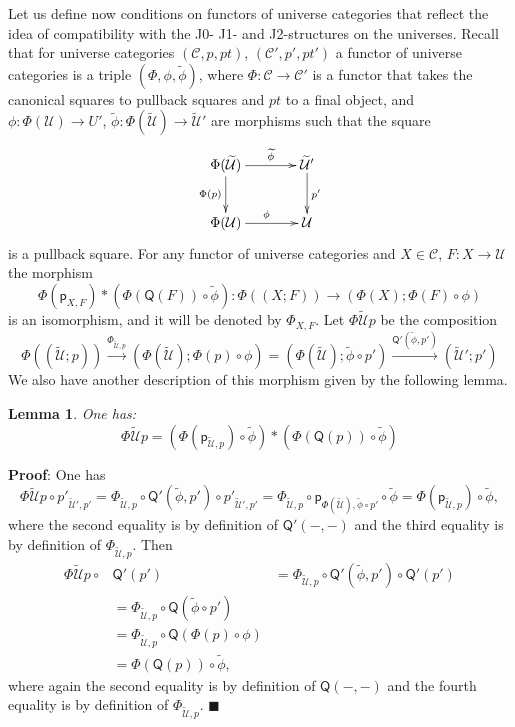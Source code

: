 \documentclass[12pt]{article}
\numberwithin{equation}{section}
\newenvironment{eq}{\begin{equation}}{\end{equation}}
\newenvironment{myproof}{{\bf Proof}:}{$\blacksquare$ \vskip 5mm }
\newtheorem{lemma}[proposition]{Lemma}
\newcommand{\sr}{\rightarrow}
\newcommand{\lr}{\longrightarrow}
\newcommand{\wt}{\widetilde}
\newcommand{\C}{{\mathcal C}}  %
\newcommand{\p}{\mathsf{p}}
\newcommand{\U}{\mathcal{U}}
\newcommand{\Q}{\mathsf{Q}}
\begin{document}
Let us define now conditions on functors of universe categories that reflect
the idea of compatibility with the J0- J1- and J2-structures on the
universes. Recall that for universe categories $({\C},p,pt)$,
$({\C}',p',pt')$ a functor of universe categories is a triple
$(\Phi,\phi,\wt{\phi})$, where $\Phi:{\C}\sr {\C}'$ is a functor
that takes the canonical squares to pullback squares and $pt$ to a final object,
and $\phi:\Phi(\U)\sr U'$, $\wt{\phi}:\Phi(\wt{\U})\sr \wt{\U}'$ are morphisms
such that the square
%
\begin{eq}\label{2015.04.06.eq10}
\begin{xy}
          \xymatrix@C=3pc{ \Phi(\wt{\U}) \ar[r]^-{\wt{\phi}} \ar[d]_{\Phi(p)} &
            \wt{\U}' \ar[d]^{p'}\\ \Phi(\U) \ar[r]^{\phi} & \U }
\end{xy}
\end{eq}%
%
is a pullback square. For any functor of universe categories and $X\in{\mathcal
  C}$, $F:X\sr \U$ the morphism
%
$$\Phi(\p_{X,F})*(\Phi(\Q(F))\circ\wt{\phi}):\Phi((X;F))\sr
(\Phi(X);\Phi(F)\circ\phi)$$
%
is an isomorphism, and it will be denoted by $\Phi_{X,F}$. Let $\Phi\wt{\U}p$ be the
composition
%
$$\Phi((\wt{\U};p)) \stackrel{\Phi_{\wt{\U},p}}{\lr} (\Phi(\wt{\U});\Phi(p)\circ
\phi)=(\Phi(\wt{\U});\wt{\phi}\circ p')\stackrel{\Q'(\wt{\phi},p')}{\lr}
(\wt{\U}';p')$$
%
We also have another description of this morphism given by the following lemma.
%
\begin{lemma}
\label{2015.04.10.l5} One has:
%
$$\Phi\wt{\U}p=(\Phi(\p_{\wt{\U},p})\circ\wt{\phi})*(\Phi(\Q(p))\circ\wt{\phi})$$
%
\end{lemma}
%
\begin{myproof}
One has
%
$$\Phi\wt{\U}p\circ p'_{\wt{\U}',p'}=\Phi_{\wt{\U},p}\circ \Q'(\wt{\phi},p')\circ
p'_{\wt{\U}',p'} =\Phi_{\wt{\U},p}\circ \p_{\Phi(\wt{\U}),\wt{\phi}\circ
  p'}\circ\wt{\phi}=\Phi(\p_{\wt{\U},p})\circ \wt{\phi},$$
%
where the second equality is by definition of $\Q'(-,-)$ and the third equality
is by definition of $\Phi_{\wt{\U},p}$. Then
%
\begin{align*}
  \Phi\wt{\U}p\circ & \Q'(p')
    & = \Phi_{\wt{\U},p}\circ \Q'(\wt{\phi},p')\circ \Q'(p') \\
    & = \Phi_{\wt{\U},p}\circ \Q(\wt{\phi}\circ p') \\
    & = \Phi_{\wt{\U},p}\circ \Q(\Phi(p)\circ \phi) \\
    & = \Phi(\Q(p))\circ \wt{\phi},
\end{align*}
%
where again the second equality is by definition of $\Q(-,-)$ and the fourth
equality is by definition of $\Phi_{\wt{\U},p}$.
\end{myproof}
\end{document}
